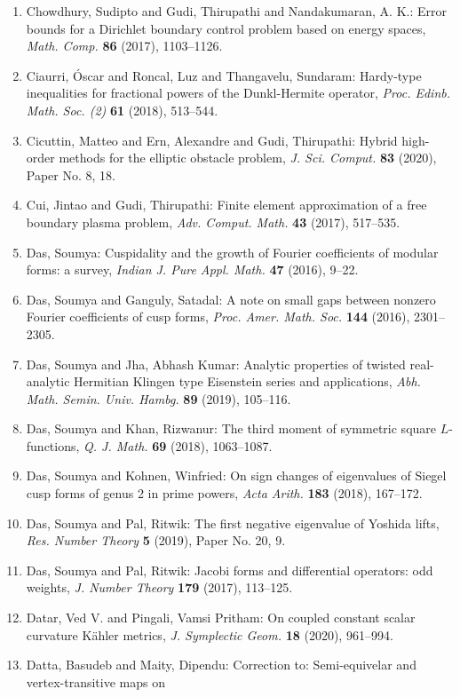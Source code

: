 \begin{enumerate}
\item Chowdhury, Sudipto and Gudi, Thirupathi and Nandakumaran, A.
K.: Error bounds for a {D}irichlet boundary control problem based
on energy spaces, \emph{Math. Comp.} {\bf 86} (2017), 1103--1126.
\item Ciaurri, \'{O}scar and Roncal, Luz and Thangavelu, Sundaram: Hardy-type inequalities for fractional powers of the
{D}unkl-{H}ermite operator, \emph{Proc. Edinb. Math. Soc. (2)} {\bf 61} (2018), 513--544.
\item Cicuttin, Matteo and Ern, Alexandre and Gudi, Thirupathi: Hybrid high-order methods for the elliptic obstacle problem, \emph{J. Sci. Comput.} {\bf 83} (2020), Paper No. 8, 18.
\item Cui, Jintao and Gudi, Thirupathi: Finite element approximation of a free boundary plasma
problem, \emph{Adv. Comput. Math.} {\bf 43} (2017), 517--535.
\item Das, Soumya: Cuspidality and the growth of {F}ourier coefficients of
modular forms: a survey, \emph{Indian J. Pure Appl. Math.} {\bf 47} (2016), 9--22.
\item Das, Soumya and Ganguly, Satadal: A note on small gaps between nonzero {F}ourier coefficients of
cusp forms, \emph{Proc. Amer. Math. Soc.} {\bf 144} (2016), 2301--2305.
\item Das, Soumya and Jha, Abhash Kumar: Analytic properties of twisted real-analytic {H}ermitian
{K}lingen type {E}isenstein series and applications, \emph{Abh. Math. Semin. Univ. Hambg.} {\bf 89} (2019), 105--116.
\item Das, Soumya and Khan, Rizwanur: The third moment of symmetric square {$L$}-functions, \emph{Q. J. Math.} {\bf 69} (2018), 1063--1087.
\item Das, Soumya and Kohnen, Winfried: On sign changes of eigenvalues of {S}iegel cusp forms of genus
2 in prime powers, \emph{Acta Arith.} {\bf 183} (2018), 167--172.
\item Das, Soumya and Pal, Ritwik: The first negative eigenvalue of {Y}oshida lifts, \emph{Res. Number Theory} {\bf 5} (2019), Paper No. 20, 9.
\item Das, Soumya and Pal, Ritwik: Jacobi forms and differential operators: odd weights, \emph{J. Number Theory} {\bf 179} (2017), 113--125.
\item Datar, Ved V. and Pingali, Vamsi Pritham: On coupled constant scalar curvature {K}\"{a}hler metrics, \emph{J. Symplectic Geom.} {\bf 18} (2020), 961--994.
\item Datta, Basudeb and Maity, Dipendu: Correction to: {S}emi-equivelar and vertex-transitive maps on

\end{enumerate}
